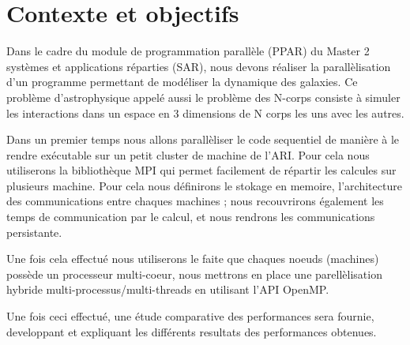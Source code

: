 \section{Contexte et objectifs}
\par Dans le cadre du module de programmation parallèle (PPAR)
du Master 2 systèmes et applications réparties (SAR), nous devons réaliser
la parallèlisation d'un programme permettant de modéliser la dynamique des galaxies.
Ce problème d'astrophysique appelé aussi le problème des N-corps consiste à 
simuler les interactions dans un espace en 3 dimensions de N corps les uns avec
les autres.\\
\par Dans un premier temps nous allons parallèliser le code sequentiel de manière 
à le rendre exécutable sur un petit cluster de machine de l'ARI. Pour cela nous 
utiliserons la bibliothèque MPI qui permet facilement de répartir les calcules sur 
plusieurs machine. Pour cela nous définirons le stokage en memoire, l'architecture des
communications entre chaques machines ; nous recouvrirons également les temps de 
communication par le calcul, et nous rendrons les communications persistante.\\
\par Une fois cela effectué nous utiliserons le faite que chaques noeuds (machines)
possède un processeur multi-coeur, nous mettrons en place une parellèlisation hybride
multi-processus/multi-threads en utilisant l'API OpenMP.\\
\par Une fois ceci effectué, une étude comparative des performances sera fournie,
developpant et expliquant les différents resultats des performances obtenues.\\
